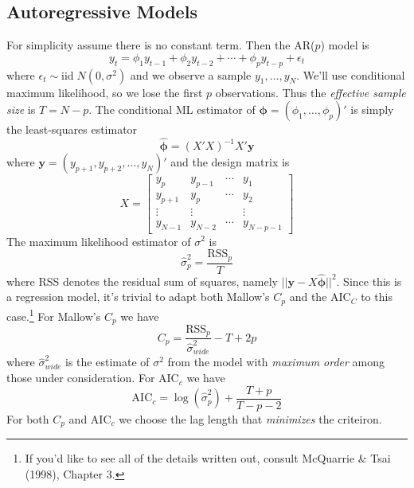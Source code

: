 \documentclass[12pt]{article}
\theoremstyle{definition}
\begin{document}
\subsection{Autoregressive Models}
For simplicity assume there is no constant term. Then the AR($p$) model is
	$$y_t = \phi_1 y_{t-1} + \phi_2 y_{t-2} + \cdots + \phi_p y_{t-p} + \epsilon_t$$
where $\epsilon_t \sim \mbox{iid} \; N(0,\sigma^2)$ and we observe a sample $y_1, \hdots, y_N$. We'll use conditional maximum likelihood, so we lose the first $p$ observations. Thus the \emph{effective sample size} is $T = N-p$. The conditional ML estimator of $\boldsymbol{\phi} = \left(\phi_1, \hdots, \phi_p \right)'$ is simply the least-squares estimator
	$$\widehat{\boldsymbol{\phi}} = (X'X)^{-1}X'\textbf{y}$$
where $\mathbf{y} = (y_{p+1}, y_{p+2}, \hdots, y_N)'$ and the design matrix is
	$$X = \left[ \begin{array}
		{cccc}
		y_p & y_{p-1} & \cdots & y_1\\
		y_{p+1} & y_{p} & \cdots  & y_2\\
		\vdots &  \vdots & &\vdots\\
		y_{N-1} & y_{N-2} &\cdots & y_{N-p-1}
	\end{array}\right]$$
The maximum likelihood estimator of $\sigma^2$ is
	$$\widehat{\sigma}^2_p = \frac{\mbox{RSS}_p}{T}$$
where RSS denotes the residual sum of squares, namely $\lvert\lvert\mathbf{y} - X\widehat{\boldsymbol{\phi}} \rvert\rvert^2$. Since this is a regression model, it's trivial to adapt both Mallow's $C_p$ and the AIC$_C$ to this case.\footnote{If you'd like to see all of the details written out, consult McQuarrie \& Tsai (1998), Chapter 3.} For Mallow's $C_p$ we have
	$$C_p = \frac{\mbox{RSS}_p}{\widehat{\sigma}^2_{wide}} - T + 2p$$
where $\widehat{\sigma}^2_{wide}$ is the estimate of $\sigma^2$ from the model with \emph{maximum order} among those under consideration. For AIC$_c$ we have
	$$\mbox{AIC}_c = \log\left(\widehat{\sigma}^2_p \right) + \frac{T+p}{T-p-2} $$
For both $C_p$ and AIC$_c$ we choose the lag length that \emph{minimizes} the criteiron. 
\end{document}
